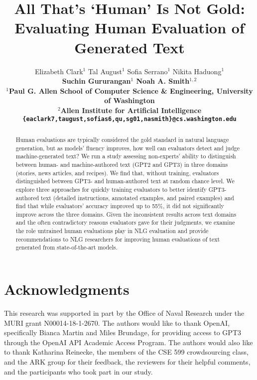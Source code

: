 \documentclass[11pt,a4paper]{article}
\title{All That's `Human' Is Not Gold: \\ Evaluating Human Evaluation of Generated Text}
\author{Elizabeth Clark$^1$ \qquad Tal August$^1$ \qquad Sofia Serrano$^1$ \qquad Nikita Haduong$^1$ \\ \bf{Suchin Gururangan$^1$} \qquad \bf{Noah A. Smith$^{1,2}$} \\
$^1$Paul G. Allen School of Computer Science \& Engineering, University of Washington \\
$^2$Allen Institute for Artificial Intelligence \\
\texttt{\{eaclark7,taugust,sofias6,qu,sg01,nasmith\}@cs.washington.edu}}
\begin{document}
\maketitle
\begin{abstract}
Human evaluations are typically considered the gold standard in natural language generation, but as models' fluency improves,
how well can evaluators detect and judge machine-generated text?
We run a study assessing non-experts' ability to distinguish between human- and machine-authored text (GPT2 and GPT3) in three domains (stories, news articles, and recipes).
We find that, without training, evaluators distinguished between GPT3- and human-authored text at random chance level. 
We explore three approaches for quickly training evaluators to better identify GPT3-authored text (detailed instructions, annotated examples, and paired examples) and find that while evaluators' accuracy improved up to 55\%, it did not significantly improve across the three domains.
Given the inconsistent results across text domains and the often contradictory reasons evaluators gave for their judgments, 
we examine the role untrained human evaluations play in NLG evaluation
and provide recommendations to NLG researchers for improving human evaluations of text generated from state-of-the-art models.


\end{abstract}











\section*{Acknowledgments}
This research was supported in part by the Office of Naval Research under the MURI grant N00014-18-1-2670. The authors would like to thank OpenAI, specifically Bianca Martin and Miles Brundage, for providing access to GPT3 through the OpenAI API Academic Access Program. The authors would also like to thank Katharina Reinecke, the members of the CSE 599 crowdsourcing class, and the ARK group for their feedback, the reviewers for their helpful comments, and the participants who took part in our study.
\end{document}
